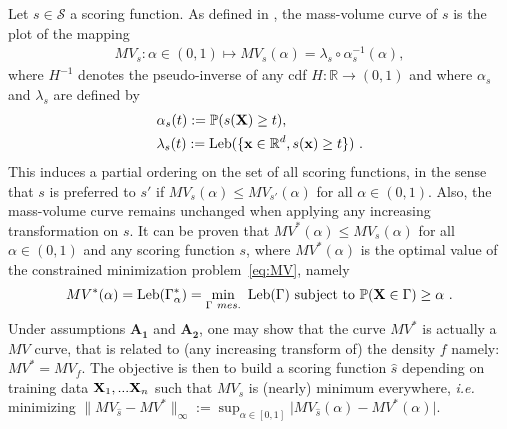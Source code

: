 Let $s\in \mathcal{S}$ a scoring function. As defined in \cite{CLEM13,CLEM14}, the mass-volume curve of $s$ is the plot of the mapping 
\begin{align*}
MV_s : \alpha\in (0,1)\mapsto MV_s(\alpha) = \lambda_s \circ \alpha_s^{-1}(\alpha),
\end{align*}
where $H^{-1}$ denotes the pseudo-inverse of any cdf $H:\mathbb{R}\rightarrow (0,1)$ and where $\alpha_s$ and $\lambda_s$ are defined by
\begin{equation}
\begin{aligned}
\label{eq:alpha_beta}
&\alpha_s(t):= \mathbb{P}(s(\mathbf X) \ge t), \\
&\lambda_s(t):=\text{Leb}(\{\mathbf x \in \mathbb{R}^d, s(\mathbf x) \ge t\})~.
\end{aligned}
\end{equation}
%
This induces a partial ordering on the set of all scoring functions, in the sense that $s$ is
preferred to $s'$ if $MV_{s}(\alpha) \le MV_{s'}(\alpha)$ for all
$\alpha\in(0,1)$. Also, the mass-volume curve remains unchanged when applying any increasing transformation on $s$.
It can be proven that $MV^*(\alpha)\leq MV_s(\alpha)$ for all $\alpha\in (0,1)$ and any scoring function $s$, where $MV^*(\alpha)$ is the optimal value of the constrained minimization problem~\eqref{eq:MV}, namely
%
\begin{align}
\label{def:MV}
MV^*(\alpha)= \text{Leb}(\Gamma_\alpha^*)=\min_{\Gamma~ mes.} ~\text{Leb}(\Gamma) \mbox{~subject to~} \mathbb{P}(\mathbf X \in \Gamma) \ge \alpha~.
\end{align}
%
Under assumptions $\mathbf{A_1}$ and $\mathbf{A_2}$, one may show that the curve $MV^*$ is actually a $MV$ curve, that is related to (any increasing transform of) the density $f$ namely: $MV^*=MV_f$. 
The objective is then to build a scoring function $\hat s$ depending on training data $\mathbf X_1,...\mathbf X_n$ such that $MV_{\hat s}$ is (nearly) minimum everywhere, \textit{i.e.} minimizing $\|MV_{\hat s}-MV^*\|_{\infty}:=\sup_{\alpha\in[0,1]}\vert MV_{\hat s}(\alpha)-MV^*(\alpha)\vert$.

